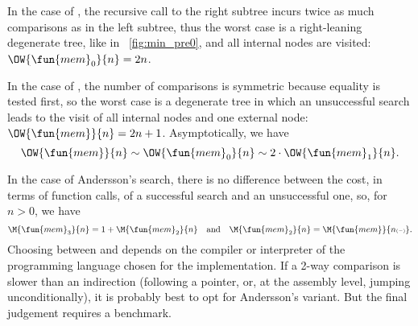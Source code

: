 In the case of , the recursive call to the right
subtree incurs twice as much comparisons as in the left subtree, thus
the worst case is a right\hyp{}leaning degenerate tree, like in
\fig~\vref{fig:min_pre0}, and all internal nodes are visited:
\(\OW{\fun{mem}_0}{n} = 2n\).

In the case of , the number of comparisons is symmetric
because equality is tested first, so the worst case is a degenerate
tree in which an unsuccessful search leads to the visit of all
internal nodes and one external node: \(\OW{\fun{mem}}{n} = 2n +
1\). Asymptotically, we have
\begin{equation*}
\OW{\fun{mem}}{n} \sim \OW{\fun{mem}_0}{n}
\sim 2 \cdot \OW{\fun{mem}_1}{n}.
\end{equation*}

In the case of Andersson's search, there is no difference between the
cost, in terms of function calls, of a successful search and an
unsuccessful one, so, for \(n > 0\), we have
\begin{equation}
\M{\fun{mem}_3}{n} = 1 + \M{\fun{mem}_2}{n}\quad\text{and}\quad
\M{\fun{mem}_2}{n} = \M{\fun{mem}}{n{\scriptscriptstyle (-)}}.
\label{eq:Andersson_average}
\index{mem3@$\M{\fun{mem}_3}{n}$}\index{mem2@$\M{\fun{mem}_2}{n}$}
\end{equation}
Choosing between  and  depends on
the compiler or interpreter of the programming language chosen for the
implementation. If a 2-way comparison is slower than an indirection
(following a pointer, or, at the assembly level, jumping
unconditionally), it is probably best to opt for Andersson's
variant. But the final judgement requires a benchmark.

